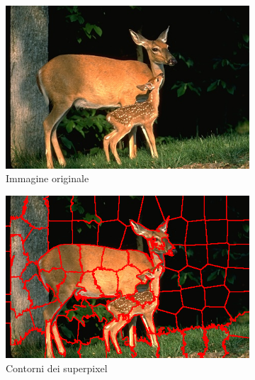 \documentclass[12pt,a4paper,oneside]{article}
\begin{document}
\begin{figure}[!htb]
\begin{subfigure}[t]{.325\textwidth}
	\end{subfigure}%
	\vspace{.01\textwidth}\setcounter{subfigure}{0}
	\begin{subfigure}[t]{.325\textwidth}
		\includegraphics[width=\textwidth]{resources/images/es3_superpixel_originale.png}
		\caption{Immagine originale}	
	\end{subfigure}%
	\hfill
	\begin{subfigure}[t]{.325\textwidth}
		\includegraphics[width=\textwidth]{resources/images/es3_superpixel_contorni.png}
		\captionsetup{justification=centering}
		\caption{Contorni dei superpixel}
	\end{subfigure}%
	\hfill
	\begin{subfigure}[t]{.325\textwidth}

\end{subfigure}
\end{figure}
\end{document}
